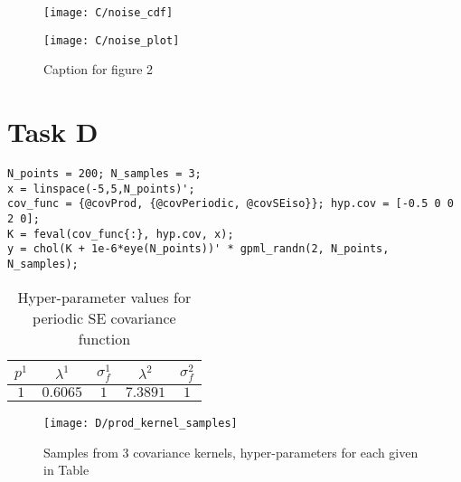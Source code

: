 \documentclass[11pt]{article}
\begin{document}
\begin{figure}[ht]
    \centering
    \begin{minipage}{0.5\textwidth}
        \centering
        \texttt{[image: C/noise\_cdf]} %
    \end{minipage}%
    \begin{minipage}{0.5\textwidth}
        \centering
        \texttt{[image: C/noise\_plot]} %
    \end{minipage}
    \caption{Caption for figure 2}
    \label{fig:C_noise_distribution}
\end{figure}

\section{Task D}

\begin{lstlisting}[caption=Code sample a GP with covariance defined by the product of a periodic SE kernel and a SE kernel, captionpos=b, basicstyle=\small]
N_points = 200; N_samples = 3;
x = linspace(-5,5,N_points)';
cov_func = {@covProd, {@covPeriodic, @covSEiso}}; hyp.cov = [-0.5 0 0 2 0];
K = feval(cov_func{:}, hyp.cov, x);
y = chol(K + 1e-6*eye(N_points))' * gpml_randn(2, N_points, N_samples);
\end{lstlisting}

\begin{table}[h]
    \centering
    \begin{tabular}{|c|c|c|c|c|}
        \hline
        $p^1$ & $\lambda^1$ & $\sigma_f^1$ & $\lambda^2$ & $\sigma_f^2$ \\
        \hline
        $1$ & $0.6065$ & $1$ & $7.3891$ & $1$ \\
        \hline
    \end{tabular}
    \caption{Hyper-parameter values for periodic SE covariance function}
    \label{table:D_product_covariance_hyper_parameters}
\end{table}

\begin{figure}[h]
    \centering
    \texttt{[image: D/prod\_kernel\_samples]}
    \caption{Samples from 3 covariance kernels, hyper-parameters for each given in Table}
    \label{fig:D_prod_kernel_samples}
\end{figure}
\end{document}
